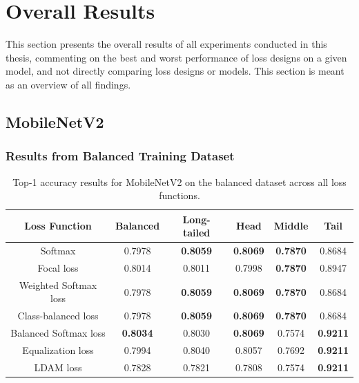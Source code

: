 

\section{Overall Results}
This section presents the overall results of all experiments conducted in this thesis, commenting on the best and worst performance of loss designs on a given model, and not directly comparing loss designs or models. This section is meant as an overview of all findings.

\subsection{MobileNetV2}

\subsubsection{Results from Balanced Training Dataset}

\begin{table}[H]
    \centering
    \caption{Top-1 accuracy results for MobileNetV2 on the balanced dataset across all loss functions.}
    \begin{tabular}{cccccc}
        \toprule
        Loss Function & Balanced & Long-tailed & Head & Middle & Tail \\ 
        \midrule
        Softmax   & 0.7978   & \textbf{0.8059} & \textbf{0.8069} & \textbf{0.7870} & 0.8684 \\
        Focal loss   & 0.8014   & 0.8011 & 0.7998 & \textbf{0.7870} & 0.8947 \\
        Weighted Softmax loss   & 0.7978   & \textbf{0.8059} & \textbf{0.8069} & \textbf{0.7870} & 0.8684 \\
        Class-balanced loss   & 0.7978   & \textbf{0.8059} & \textbf{0.8069} & \textbf{0.7870} & 0.8684 \\
        Balanced Softmax loss   & \textbf{0.8034}  & 0.8030 & \textbf{0.8069} & 0.7574 & \textbf{0.9211} \\
        Equalization loss   & 0.7994   & 0.8040 & 0.8057 & 0.7692 & \textbf{0.9211} \\
        LDAM loss   &  0.7828   & 0.7821 & 0.7808 & 0.7574 & \textbf{0.9211} \\
        \bottomrule
    \end{tabular}
    \label{tab:mobilenet_bal_acc1_1}
\end{table}

